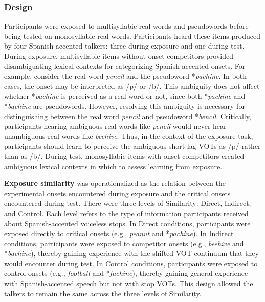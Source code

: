 \documentclass[preprint, 3p, authoryear]{elsarticle} %
\begin{document}
\hypertarget{methods-design-1a}{%
\subsubsection{Design}\label{methods-design-1a}}

Participants were exposed to multisyllabic real words and pseudowords before being tested on monosyllabic real words.
Participants heard these items produced by four Spanish-accented talkers: three during exposure and one during test.
During exposure, multisyllabic items without onset competitors provided disambiguating lexical contexts for categorizing Spanish-accented onsets.
For example, consider the real word \emph{pencil} and the pseudoword *\emph{pachine}.
In both cases, the onset may be interpreted as /p/ or /b/.
This ambiguity does not affect whether *\emph{pachine} is perceived as a real word or not, since both *\emph{pachine} and *\emph{bachine} are pseudowords.
However, resolving this ambiguity is necessary for distinguishing between the real word \emph{pencil} and pseudoword *\emph{bencil}.
Critically, participants hearing ambiguous real words like \emph{pencil} would never hear unambiguous real words like \emph{beehive}.
Thus, in the context of the exposure task, participants should learn to perceive the ambiguous short lag VOTs as /p/ rather than as /b/.
During test, monosyllabic items with onset competitors created ambiguous lexical contexts in which to assess learning from exposure.

\textbf{Exposure similarity} was operationalized as the relation between the experimental onsets encountered during exposure and the critical onsets encountered during test.
There were three levels of Similarity: Direct, Indirect, and Control.
Each level refers to the type of information participants received about Spanish-accented voiceless stops.
In Direct conditions, participants were exposed directly to critical onsets (e.g., \emph{peanut} and *\emph{pachine}).
In Indirect conditions, participants were exposed to competitor onsets (e.g., \emph{beehive} and *\emph{bachine}), thereby gaining experience with the shifted VOT continuum that they would encounter during test.
In Control conditions, participants were exposed to control onsets (e.g., \emph{football} and *\emph{fachine}), thereby gaining general experience with Spanish-accented speech but not with stop VOTs.
This design allowed the talkers to remain the same across the three levels of Similarity.
\end{document}
